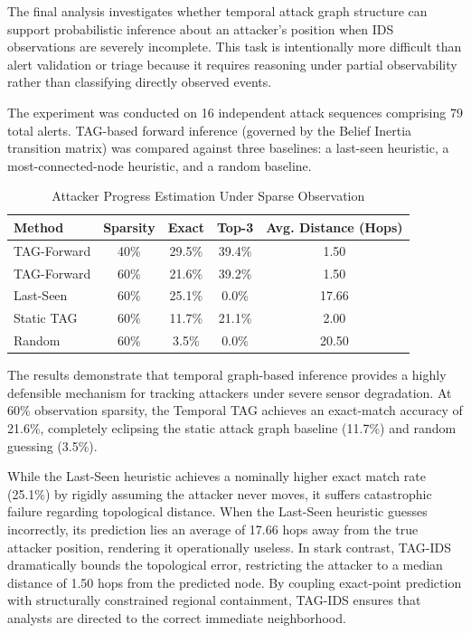 The final analysis investigates whether temporal attack graph structure can support probabilistic inference about an attacker's position when IDS observations are severely incomplete. This task is intentionally more difficult than alert validation or triage because it requires reasoning under partial observability rather than classifying directly observed events.

The experiment was conducted on 16 independent attack sequences comprising 79 total alerts. TAG-based forward inference (governed by the Belief Inertia transition matrix) was compared against three baselines: a last-seen heuristic, a most-connected-node heuristic, and a random baseline.

\begin{table}[h!]
\centering
\caption{Attacker Progress Estimation Under Sparse Observation}
\label{tab:attacker_progress}
\begin{tabular}{lcccc}
\toprule
Method & Sparsity & Exact & Top-3 & Avg. Distance (Hops) \\
\midrule
TAG-Forward & 40\% & 29.5\% & 39.4\% & 1.50 \\
TAG-Forward & 60\% & 21.6\% & 39.2\% & 1.50 \\
Last-Seen & 60\% & 25.1\% & 0.0\% & 17.66 \\
Static TAG & 60\% & 11.7\% & 21.1\% & 2.00 \\
Random & 60\% & 3.5\% & 0.0\% & 20.50 \\
\bottomrule
\end{tabular}
\end{table}

The results demonstrate that temporal graph-based inference provides a highly defensible mechanism for tracking attackers under severe sensor degradation. At 60\% observation sparsity, the Temporal TAG achieves an exact-match accuracy of 21.6\%, completely eclipsing the static attack graph baseline (11.7\%) and random guessing (3.5\%). 

While the Last-Seen heuristic achieves a nominally higher exact match rate (25.1\%) by rigidly assuming the attacker never moves, it suffers catastrophic failure regarding topological distance. When the Last-Seen heuristic guesses incorrectly, its prediction lies an average of 17.66 hops away from the true attacker position, rendering it operationally useless. In stark contrast, TAG-IDS dramatically bounds the topological error, restricting the attacker to a median distance of 1.50 hops from the predicted node. By coupling exact-point prediction with structurally constrained regional containment, TAG-IDS ensures that analysts are directed to the correct immediate neighborhood.

